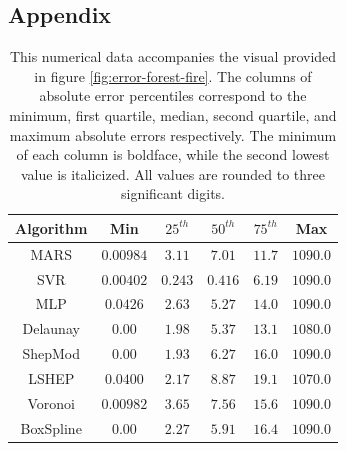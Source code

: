 \documentclass[smallextended,final]{svjour3}       %
\begin{document}
\begin{appendix}

\section*{Appendix}

\begin{table}
  \centering
  \begin{tabular}{c|c|c|c|c|c}
    \hline
    Algorithm & Min & $25^{th}$ & $50^{th}$ & $75^{th}$ & Max\\
    \hline
    MARS & $0.00984$ & $3.11$ & $7.01$ & $\mathit{11.7}$ & $1090.0$\\
    SVR & $\mathit{0.00402}$ & $\mathbf{0.243}$ & $\mathbf{0.416}$ & $\mathbf{6.19}$ & $1090.0$\\
    MLP & $0.0426$ & $2.63$ & $\mathit{5.27}$ & $14.0$ & $1090.0$\\
    Delaunay & $\mathbf{0.00}$ & $1.98$ & $5.37$ & $13.1$ & $\mathit{1080.0}$\\
    ShepMod & $\mathbf{0.00}$ & $\mathit{1.93}$ & $6.27$ & $16.0$ & $1090.0$\\
    LSHEP & $0.0400$ & $2.17$ & $8.87$ & $19.1$ & $\mathbf{1070.0}$\\
    Voronoi & $0.00982$ & $3.65$ & $7.56$ & $15.6$ & $1090.0$\\
    BoxSpline & $\mathbf{0.00}$ & $2.27$ & $5.91$ & $16.4$ & $1090.0$\\
    \hline
  \end{tabular}
  \caption{This numerical data accompanies the visual provided in figure \ref{fig:error-forest-fire}. The columns of absolute error percentiles correspond to the minimum, first quartile, median, second quartile, and maximum absolute errors respectively. The minimum of each column is boldface, while the second lowest value is italicized. All values are rounded to three significant digits.}
  \label{table:error-forest-fire}
\end{table}


\end{appendix}
\end{document}
